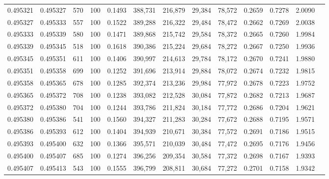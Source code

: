 \begin{tabular}{rrrrrrrrrrrrr}
0.495321 & 0.495327 &   570 & 100 &                                     0.1493 & 388,731 & 216,879 &  29,384 &  78,572 & 0.2659 & 0.7278 & 2.0090 \\
0.495327 & 0.495333 &   557 & 100 &                                     0.1522 & 389,288 & 216,322 &  29,484 &  78,472 & 0.2662 & 0.7269 & 2.0038 \\
0.495333 & 0.495339 &   580 & 100 &                                     0.1471 & 389,868 & 215,742 &  29,584 &  78,372 & 0.2665 & 0.7260 & 1.9984 \\
0.495339 & 0.495345 &   518 & 100 &                                     0.1618 & 390,386 & 215,224 &  29,684 &  78,272 & 0.2667 & 0.7250 & 1.9936 \\
0.495345 & 0.495351 &   611 & 100 &                                     0.1406 & 390,997 & 214,613 &  29,784 &  78,172 & 0.2670 & 0.7241 & 1.9880 \\
0.495351 & 0.495358 &   699 & 100 &                                     0.1252 & 391,696 & 213,914 &  29,884 &  78,072 & 0.2674 & 0.7232 & 1.9815 \\
0.495358 & 0.495365 &   678 & 100 &                                     0.1285 & 392,374 & 213,236 &  29,984 &  77,972 & 0.2678 & 0.7223 & 1.9752 \\
0.495365 & 0.495372 &   708 & 100 &                                     0.1238 & 393,082 & 212,528 &  30,084 &  77,872 & 0.2682 & 0.7213 & 1.9687 \\
0.495372 & 0.495380 &   704 & 100 &                                     0.1244 & 393,786 & 211,824 &  30,184 &  77,772 & 0.2686 & 0.7204 & 1.9621 \\
0.495380 & 0.495386 &   541 & 100 &                                     0.1560 & 394,327 & 211,283 &  30,284 &  77,672 & 0.2688 & 0.7195 & 1.9571 \\
0.495386 & 0.495393 &   612 & 100 &                                     0.1404 & 394,939 & 210,671 &  30,384 &  77,572 & 0.2691 & 0.7186 & 1.9515 \\
0.495393 & 0.495400 &   632 & 100 &                                     0.1366 & 395,571 & 210,039 &  30,484 &  77,472 & 0.2695 & 0.7176 & 1.9456 \\
0.495400 & 0.495407 &   685 & 100 &                                     0.1274 & 396,256 & 209,354 &  30,584 &  77,372 & 0.2698 & 0.7167 & 1.9393 \\
0.495407 & 0.495413 &   543 & 100 &                                     0.1555 & 396,799 & 208,811 &  30,684 &  77,272 & 0.2701 & 0.7158 & 1.9342 \\

\end{tabular}
